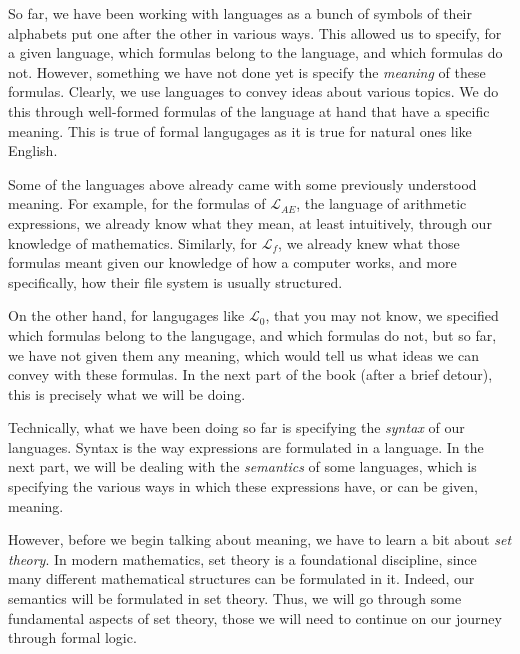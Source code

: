 So far, we have been working with languages as a bunch of symbols of their alphabets put one after the other in various ways. This allowed us to specify, for a given language, which formulas belong to the language, and which formulas do not. However, something we have not done yet is specify the \textit{meaning} of these formulas. Clearly, we use languages to convey ideas about various topics. We do this through well-formed formulas of the language at hand that have a specific meaning. This is true of formal langugages as it is true for natural ones like English. 

Some of the languages above already came with some previously understood meaning. For example, for the formulas of $\mathcal{L}_{AE}$, the language of arithmetic expressions, we already know what they mean, at least intuitively, through our knowledge of mathematics. Similarly, for $\mathcal{L}_f$, we already knew what those formulas meant given our knowledge of how a computer works, and more specifically, how their file system is usually structured. 

On the other hand, for langugages like $\mathcal{L}_0$, that you may not know, we specified which formulas belong to the langugage, and which formulas do not, but so far, we have not given them any meaning, which would tell us what ideas we can convey with these formulas. In the next part of the book (after a brief detour), this is precisely what we will be doing. 

Technically, what we have been doing so far is specifying the \textit{syntax} of our languages. Syntax is the way expressions are formulated in a language. In the next part, we will be dealing with the \textit{semantics} of some languages, which is specifying the various ways in which these expressions have, or can be given, meaning. 

However, before we begin talking about meaning, we have to learn a bit about \textit{set theory}. In modern mathematics, set theory is a foundational discipline, since many different mathematical structures can be formulated in it. Indeed, our semantics will be formulated in set theory. Thus, we will go through some fundamental aspects of set theory, those we will need to continue on our journey through formal logic. 